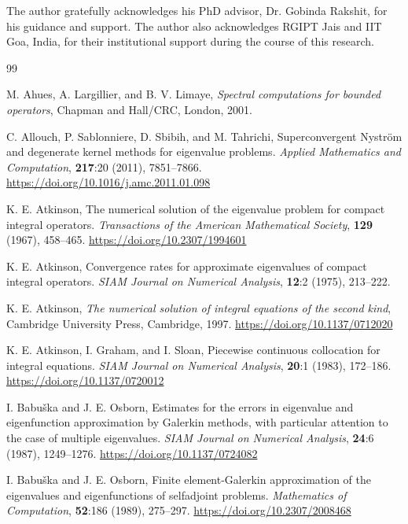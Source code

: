 \documentclass[]{interact}
\theoremstyle{plain}%
\theoremstyle{definition}
\theoremstyle{remark}
\begin{document}
The author gratefully acknowledges his PhD advisor, Dr. Gobinda Rakshit, for his guidance and support. The author also acknowledges RGIPT Jais and IIT Goa, India, for their institutional support during the course of this research.




\begin{thebibliography}{99}
	
	M. Ahues, A. Largillier, and B. V. Limaye, \textit{Spectral computations for bounded operators}, Chapman and Hall/CRC, London, 2001.
	
	C. Allouch, P. Sablonniere, D. Sbibih, and M. Tahrichi, Superconvergent Nystr\"om and degenerate kernel methods for eigenvalue problems. \textit{Applied Mathematics and Computation}, \textbf{217}:20 (2011), 7851--7866.
	\url{https://doi.org/10.1016/j.amc.2011.01.098}
	
	K. E. Atkinson, The numerical solution of the eigenvalue problem for compact integral operators. \textit{Transactions of the American Mathematical Society}, \textbf{129} (1967), 458--465.
	\url{https://doi.org/10.2307/1994601}
	
	K. E. Atkinson, Convergence rates for approximate eigenvalues of compact integral operators. \textit{SIAM Journal on Numerical Analysis}, \textbf{12}:2 (1975), 213--222.
	
	K. E. Atkinson, \textit{The numerical solution of integral equations of the second kind}, Cambridge University Press, Cambridge, 1997.
	\url{https://doi.org/10.1137/0712020}
	
	K. E. Atkinson, I. Graham, and I. Sloan, Piecewise continuous collocation for integral equations. \textit{SIAM Journal on Numerical Analysis}, \textbf{20}:1 (1983), 172--186.
	\url{https://doi.org/10.1137/0720012}
	
	I. Babu\v{s}ka and J. E. Osborn, Estimates for the errors in eigenvalue and eigenfunction approximation by Galerkin methods, with particular attention to the case of multiple eigenvalues. \textit{SIAM Journal on Numerical Analysis}, \textbf{24}:6 (1987), 1249--1276.
	\url{https://doi.org/10.1137/0724082}
	
	I. Babu\v{s}ka and J. E. Osborn, Finite element-Galerkin approximation of the eigenvalues and eigenfunctions of selfadjoint problems. \textit{Mathematics of Computation}, \textbf{52}:186 (1989), 275--297.
	\url{https://doi.org/10.2307/2008468}
	

\end{thebibliography}
\end{document}
